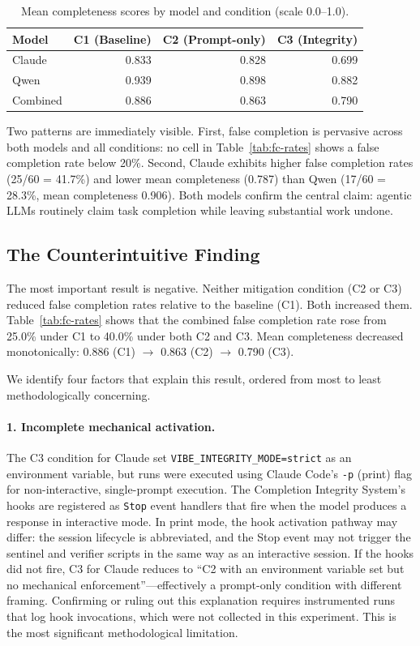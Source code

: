 \begin{table}[htbp]
\centering
\caption{Mean completeness scores by model and condition (scale 0.0--1.0).}
\label{tab:completeness}
\begin{tabular}{lrrr}
\toprule
Model & C1 (Baseline) & C2 (Prompt-only) & C3 (Integrity) \\
\midrule
Claude & 0.833 & 0.828 & 0.699 \\
Qwen & 0.939 & 0.898 & 0.882 \\
\midrule
Combined & 0.886 & 0.863 & 0.790 \\
\bottomrule
\end{tabular}
\end{table}

Two patterns are immediately visible.
First, false completion is pervasive across both models and all conditions: no cell in Table~\ref{tab:fc-rates} shows a false completion rate below 20\%.
Second, Claude exhibits higher false completion rates (25/60 = 41.7\%) and lower mean completeness (0.787) than Qwen (17/60 = 28.3\%, mean completeness 0.906).
Both models confirm the central claim: agentic LLMs routinely claim task completion while leaving substantial work undone.


\subsection{The Counterintuitive Finding}
\label{sec:exp-counterintuitive}

The most important result is negative.
Neither mitigation condition (C2 or C3) reduced false completion rates relative to the baseline (C1).
Both increased them.
Table~\ref{tab:fc-rates} shows that the combined false completion rate rose from 25.0\% under C1 to 40.0\% under both C2 and C3.
Mean completeness decreased monotonically: 0.886 (C1) $\to$ 0.863 (C2) $\to$ 0.790 (C3).

We identify four factors that explain this result, ordered from most to least methodologically concerning.

\paragraph{1. Incomplete mechanical activation.}
The C3 condition for Claude set \texttt{VIBE\_INTEGRITY\_MODE=strict} as an environment variable, but runs were executed using Claude Code's \texttt{-p} (print) flag for non-interactive, single-prompt execution.
The Completion Integrity System's hooks are registered as \texttt{Stop} event handlers that fire when the model produces a response in interactive mode.
In print mode, the hook activation pathway may differ: the session lifecycle is abbreviated, and the Stop event may not trigger the sentinel and verifier scripts in the same way as an interactive session.
If the hooks did not fire, C3 for Claude reduces to ``C2 with an environment variable set but no mechanical enforcement''---effectively a prompt-only condition with different framing.
Confirming or ruling out this explanation requires instrumented runs that log hook invocations, which were not collected in this experiment.
This is the most significant methodological limitation.

